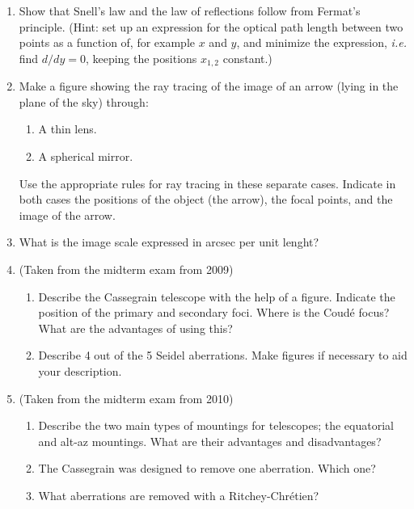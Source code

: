 \begin{enumerate}
	\item Show that Snell's law and the law of reflections follow from
		Fermat's principle. (Hint: set up an expression for the optical path length
		between two points as a function of, for example $x$ and $y$, and
		minimize the expression, {\it i.e.} find ${d/dy}=0$, keeping the
		positions $x_{1,2}$ constant.)
	\item Make a figure showing the ray tracing of the image of an arrow (lying in the plane
		of the sky) through:
	\begin{enumerate}
		\item A thin lens.
		\item A spherical mirror.
	\end{enumerate}
	Use the appropriate rules for ray tracing in these separate cases.
	Indicate in both cases the positions of the
	object (the arrow), the focal points, and the image of the arrow.
	\item What is the image scale expressed in arcsec per unit lenght?
	\item (Taken from the midterm exam from 2009) \\
		\begin{enumerate}
			\item Describe the Cassegrain telescope with the help of a figure. Indicate the
				position of the primary and secondary foci. Where is the Coud\'{e} focus? What are
				the advantages of using this?
			\item Describe 4 out of the 5 Seidel aberrations. Make figures if necessary to aid
				your description.
		\end{enumerate}
	\item (Taken from the midterm exam from 2010) \\
		\begin{enumerate}
			\item Describe the two main types of mountings for telescopes; the equatorial and
				alt-az mountings. What are their advantages and disadvantages?
			\item The Cassegrain was designed to remove one aberration. Which one?
			\item What aberrations are removed with a Ritchey-Chr\'{e}tien?
		\end{enumerate}
\end{enumerate}

%
